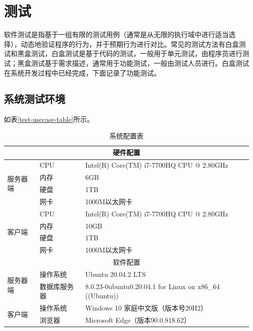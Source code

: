 \chapter{测试}
\label{测试}

软件测试是指基于一组有限的测试用例（通常是从无限的执行域中进行适当选择），动态地验证程序的行为，并于预期行为进行对比\cite{.software}。常见的测试方法有白盒测试和黑盒测试，白盒测试是基于代码的测试，一般用于单元测试，由程序员进行测试；黑盒测试基于需求描述，通常用于功能测试，一般由测试人员进行。白盒测试在系统开发过程中已经完成，下面记录了功能测试。

\section{系统测试环境}

如表\ref{test-usecase-table}所示。

\begin{table}[htbp]
  \centering
  \song\wuhao
  \caption{系统配置表}
\begin{tabular}{lll}
\hline
\multicolumn{3}{c}{硬件配置}                                                                 \\ \hline
\multirow{4}{*}{服务器端} & CPU    & Intel(R) Core(TM) i7-7700HQ CPU @ 2.80GHz               \\
                      & 内存     & 6GB                                                     \\
                      & 硬盘     & 1TB                                                     \\
                      & 网卡     & 1000M以太网卡                                               \\ \hline
\multirow{4}{*}{客户端}  & CPU    & Intel(R) Core(TM) i7-7700HQ CPU @ 2.80GHz               \\
                      & 内存     & 10GB                                                    \\
                      & 硬盘     & 1TB                                                     \\
                      & 网卡     & 1000M以太网卡                                               \\ \hline
\multicolumn{3}{c}{软件配置}                                                                 \\ \hline
\multirow{2}{*}{服务器端} & 操作系统   & Ubuntu 20.04.2 LTS                                      \\
                      & 数据库服务器 & 8.0.23-0ubuntu0.20.04.1 for Linux on x86\_64 ((Ubuntu)) \\ \hline
\multirow{2}{*}{客户端}  & 操作系统   & Windows 10 家庭中文版（版本号20H2）                               \\
                      & 浏览器    & Microsoft Edge（版本90.0.818.62）                           \\ \hline
\end{tabular}
\end{table}

